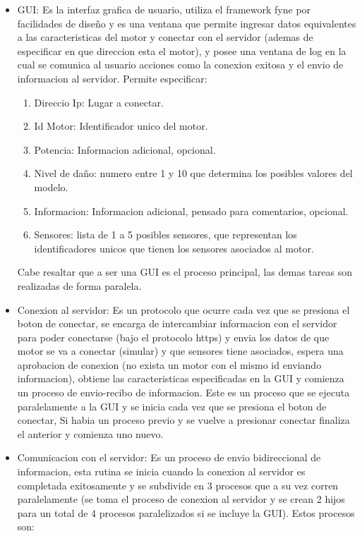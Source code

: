 \begin{itemize}
    \item GUI: Es la interfaz grafica de usuario, utiliza el framework fyne por
        facilidades
        de diseño y es una ventana que permite ingresar datos equivalentes
        a las caracteristicas del motor y conectar con el servidor (ademas de
        especificar en que direccion esta el motor), y posee una ventana de
        log en la cual se comunica al usuario acciones como la conexion exitosa y
        el envio de informacion al servidor. Permite especificar:
        \begin{enumerate}
            \item Direccio Ip: Lugar a conectar.
            \item Id Motor: Identificador unico del motor.
            \item Potencia: Informacion adicional, opcional.
            \item Nivel de daño: numero entre 1 y 10 que determina los posibles
                valores del modelo.
            \item Informacion: Informacion adicional, pensado para comentarios,
                opcional.
            \item Sensores: lista de 1 a 5 posibles sensores, que representan
                los identificadores unicos que tienen los sensores asociados
                al motor.
        \end{enumerate}

        Cabe resaltar que a ser una GUI es el proceso principal, las demas
        tareas son realizadas de forma paralela.

    \item Conexion al servidor: Es un protocolo que ocurre cada vez que se presiona
        el boton de conectar, se encarga de intercambiar informacion con el servidor
        para poder conectarse (bajo el protocolo https) y envia los datos de
        que motor se va a conectar (simular) y que sensores tiene asociados, espera
        una aprobacion de conexion (no exista un motor con el mismo id enviando
        informacion), obtiene las caracteristicas especificadas en la GUI y
        comienza un proceso de envio-recibo de informacion.
        Este es un proceso
        que se ejecuta paralelamente a la GUI y se inicia cada vez que se
        presiona el boton de conectar, Si habia un proceso previo y se vuelve a
        presionar conectar finaliza el anterior y comienza uno nuevo.

    \item Comunicacion con el servidor: Es un proceso de envio bidireccional
        de informacion, esta rutina se inicia cuando la conexion al servidor
        es completada exitosamente y se subdivide en 3 procesos que a su
        vez corren paralelamente (se toma el proceso de conexion al servidor
        y se crean 2 hijos para un total de 4 procesos paralelizados si se
        incluye la GUI). Estos procesos son:


\end{itemize}
